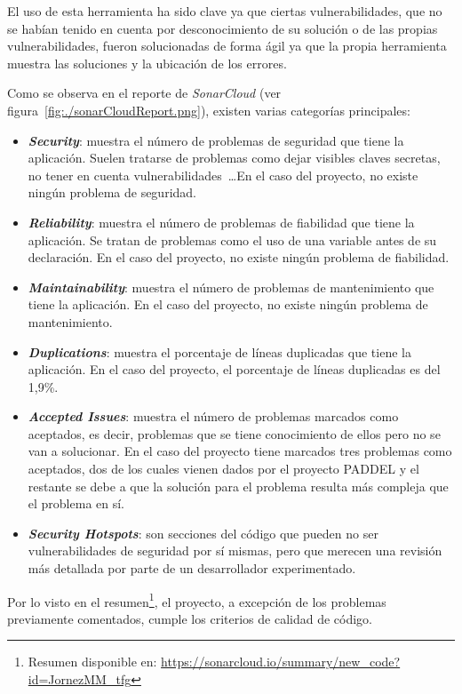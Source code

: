 El uso de esta herramienta ha sido clave ya que ciertas vulnerabilidades, que no se habían tenido en cuenta por desconocimiento de su solución o de las propias vulnerabilidades, fueron solucionadas de forma ágil ya que la propia herramienta muestra las soluciones y la ubicación de los errores.


Como se observa en el reporte de \textit{SonarCloud} (ver figura~\ref{fig:./sonarCloudReport.png}), existen varias categorías principales:
\begin{itemize}
\item \textit{\textbf{Security}}: muestra el número de problemas de seguridad que tiene la aplicación. Suelen tratarse de problemas como dejar visibles claves secretas, no tener en cuenta vulnerabilidades~\ldots En el caso del proyecto, no existe ningún problema de seguridad.
\item \textit{\textbf{Reliability}}: muestra el número de problemas de fiabilidad que tiene la aplicación. Se tratan de problemas como el uso de una variable antes de su declaración. En el caso del proyecto, no existe ningún problema de fiabilidad.
\item \textit{\textbf{Maintainability}}: muestra el número de problemas de mantenimiento que tiene la aplicación. En el caso del proyecto, no existe ningún problema de mantenimiento.
\item \textit{\textbf{Duplications}}: muestra el porcentaje de líneas duplicadas que tiene la aplicación. En el caso del proyecto, el porcentaje de líneas duplicadas es del 1,9\%.
\item \textit{\textbf{Accepted Issues}}: muestra el número de problemas marcados como aceptados, es decir, problemas que se tiene conocimiento de ellos pero no se van a solucionar. En el caso del proyecto tiene marcados tres problemas como aceptados, dos de los cuales vienen dados por el proyecto PADDEL y el restante se debe a que la solución para el problema resulta más compleja que el problema en sí.
\item \textit{\textbf{Security Hotspots}}: son secciones del código que pueden no ser vulnerabilidades de seguridad por sí mismas, pero que merecen una revisión más detallada por parte de un desarrollador experimentado.
\end{itemize}

Por lo visto en el resumen\footnote{Resumen disponible en: \url{https://sonarcloud.io/summary/new_code?id=JornezMM_tfg}}, el proyecto, a excepción de los problemas previamente comentados, cumple los criterios de calidad de código.


